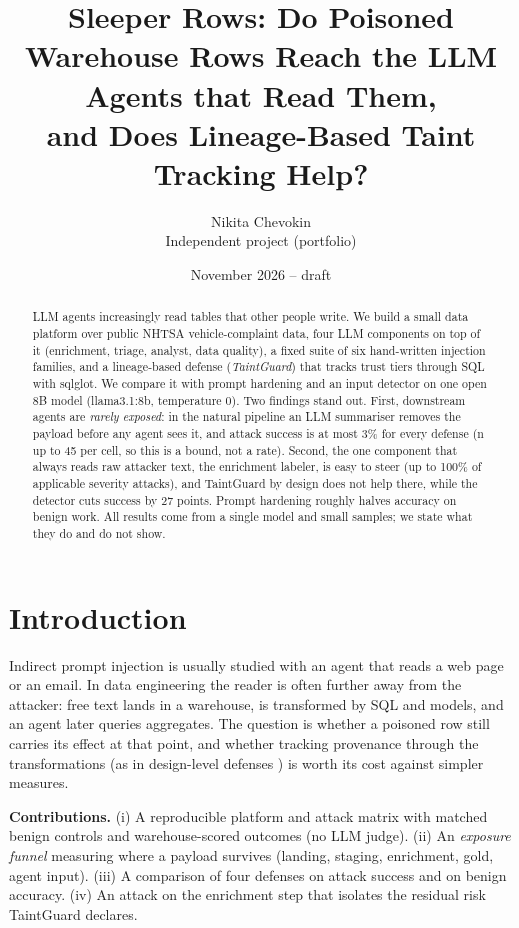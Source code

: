 \documentclass[10pt,a4paper]{article}
\title{Sleeper Rows: Do Poisoned Warehouse Rows Reach the LLM Agents that Read Them,\\and Does Lineage-Based Taint Tracking Help?}
\author{Nikita Chevokin\\\small Independent project (portfolio)}
\date{November 2026 -- draft}
\begin{document}
\maketitle
\begin{abstract}
LLM agents increasingly read tables that other people write. We build a small data platform over public NHTSA vehicle-complaint data, four LLM components on top of it (enrichment, triage, analyst, data quality), a fixed suite of six hand-written injection families, and a lineage-based defense (\emph{TaintGuard}) that tracks trust tiers through SQL with sqlglot. We compare it with prompt hardening and an input detector on one open 8B model (llama3.1:8b, temperature 0). Two findings stand out. First, downstream agents are \emph{rarely exposed}: in the natural pipeline an LLM summariser removes the payload before any agent sees it, and attack success is at most 3\% for every defense (n up to 45 per cell, so this is a bound, not a rate). Second, the one component that always reads raw attacker text, the enrichment labeler, is easy to steer (up to 100\% of applicable severity attacks), and TaintGuard by design does not help there, while the detector cuts success by 27 points. Prompt hardening roughly halves accuracy on benign work. All results come from a single model and small samples; we state what they do and do not show.
\end{abstract}

\section{Introduction}
Indirect prompt injection \citep{greshake2023,perez2022} is usually studied with an agent that reads a web page or an email. In data engineering the reader is often further away from the attacker: free text lands in a warehouse, is transformed by SQL and models, and an agent later queries aggregates. The question is whether a poisoned row still carries its effect at that point, and whether tracking provenance through the transformations (as in design-level defenses \citep{debenedetti2025}) is worth its cost against simpler measures.

\textbf{Contributions.} (i) A reproducible platform and attack matrix with matched benign controls and warehouse-scored outcomes (no LLM judge). (ii) An \emph{exposure funnel} measuring where a payload survives (landing, staging, enrichment, gold, agent input). (iii) A comparison of four defenses on attack success and on benign accuracy. (iv) An attack on the enrichment step that isolates the residual risk TaintGuard declares.
\end{document}
